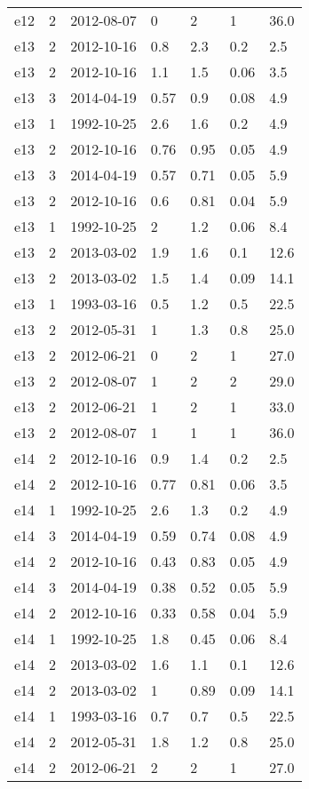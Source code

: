 \begin{table*}[htp]
\begin{tabular}{llll}
e12 & 2 & 2012-08-07 & 0 & 2 & 1 & 36.0 \\
e13 & 2 & 2012-10-16 & 0.8 & 2.3 & 0.2 & 2.5 \\
e13 & 2 & 2012-10-16 & 1.1 & 1.5 & 0.06 & 3.5 \\
e13 & 3 & 2014-04-19 & 0.57 & 0.9 & 0.08 & 4.9 \\
e13 & 1 & 1992-10-25 & 2.6 & 1.6 & 0.2 & 4.9 \\
e13 & 2 & 2012-10-16 & 0.76 & 0.95 & 0.05 & 4.9 \\
e13 & 3 & 2014-04-19 & 0.57 & 0.71 & 0.05 & 5.9 \\
e13 & 2 & 2012-10-16 & 0.6 & 0.81 & 0.04 & 5.9 \\
e13 & 1 & 1992-10-25 & 2 & 1.2 & 0.06 & 8.4 \\
e13 & 2 & 2013-03-02 & 1.9 & 1.6 & 0.1 & 12.6 \\
e13 & 2 & 2013-03-02 & 1.5 & 1.4 & 0.09 & 14.1 \\
e13 & 1 & 1993-03-16 & 0.5 & 1.2 & 0.5 & 22.5 \\
e13 & 2 & 2012-05-31 & 1 & 1.3 & 0.8 & 25.0 \\
e13 & 2 & 2012-06-21 & 0 & 2 & 1 & 27.0 \\
e13 & 2 & 2012-08-07 & 1 & 2 & 2 & 29.0 \\
e13 & 2 & 2012-06-21 & 1 & 2 & 1 & 33.0 \\
e13 & 2 & 2012-08-07 & 1 & 1 & 1 & 36.0 \\
e14 & 2 & 2012-10-16 & 0.9 & 1.4 & 0.2 & 2.5 \\
e14 & 2 & 2012-10-16 & 0.77 & 0.81 & 0.06 & 3.5 \\
e14 & 1 & 1992-10-25 & 2.6 & 1.3 & 0.2 & 4.9 \\
e14 & 3 & 2014-04-19 & 0.59 & 0.74 & 0.08 & 4.9 \\
e14 & 2 & 2012-10-16 & 0.43 & 0.83 & 0.05 & 4.9 \\
e14 & 3 & 2014-04-19 & 0.38 & 0.52 & 0.05 & 5.9 \\
e14 & 2 & 2012-10-16 & 0.33 & 0.58 & 0.04 & 5.9 \\
e14 & 1 & 1992-10-25 & 1.8 & 0.45 & 0.06 & 8.4 \\
e14 & 2 & 2013-03-02 & 1.6 & 1.1 & 0.1 & 12.6 \\
e14 & 2 & 2013-03-02 & 1 & 0.89 & 0.09 & 14.1 \\
e14 & 1 & 1993-03-16 & 0.7 & 0.7 & 0.5 & 22.5 \\
e14 & 2 & 2012-05-31 & 1.8 & 1.2 & 0.8 & 25.0 \\
e14 & 2 & 2012-06-21 & 2 & 2 & 1 & 27.0 \\

\end{tabular}
\end{table*}
